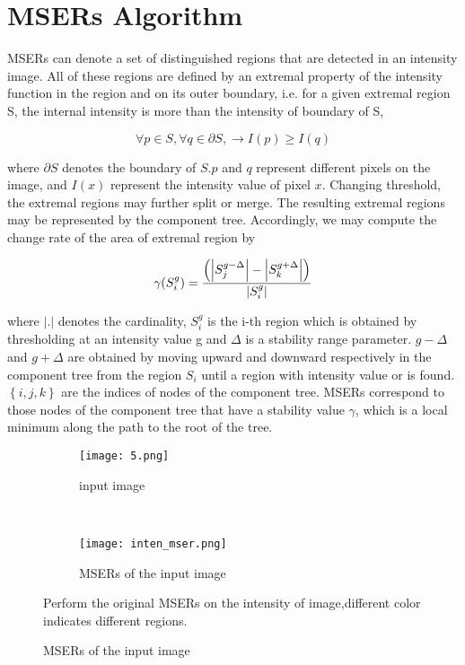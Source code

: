 \section{MSERs Algorithm}
MSERs can denote a set of distinguished regions that are detected in an intensity image. All of these regions are defined by an extremal property of the intensity function in the region and on its outer boundary, i.e. for a given extremal region S, the internal intensity is more than the intensity of boundary of S,

\[ \forall p \in S,\forall q \in \partial S , \longrightarrow I(p) \geq I(q)\]

where $\partial S $ denotes the boundary of $S$.$p$ and $q$ represent different pixels on the image, and $I(x)$ represent the intensity value of pixel $x$. 
Changing threshold, the extremal regions may further split or merge. The resulting extremal regions may be represented by the component tree. Accordingly, we may compute the change rate of the area of extremal region by

\[ \gamma(S_i^g) = \frac{\left ( \left |  S_j^{g-\Delta} \right |-\left |  S_k^{g+\Delta} \right | \right )}{\arrowvert S_i^g\arrowvert} \]

where $ \left | .  \right |$  denotes the cardinality, $ S_{i}^{g} $  is the i-th region which is obtained by thresholding at an intensity value g and $\Delta $ is a stability range parameter. $  g-\Delta $ and $ g+\Delta $ are obtained by moving upward and downward respectively in the component tree from the region $ S_{i} $ until a region with intensity value   or  is found. $ \left \{ i,j,k \right \}$ are the indices of nodes of the component tree. MSERs correspond to those nodes of the component tree that have a stability value $\gamma$, which is a local minimum along the path to the root of the tree.

\begin{figure}[H]
 	\centering
 	\begin{subfigure}[b]{0.4\textwidth}
		\centering
 		\texttt{[image: 5.png]}
 		\caption{input image}
 	\end{subfigure}
 		~  
 	\begin{subfigure}[b]{0.4\textwidth}
		\centering
	  	\texttt{[image: inten\_mser.png]}
 		\caption{MSERs of the input image}	
 	\end{subfigure}
 	\label{modifi_mser}
	Perform the original MSERs on the intensity of image,different color indicates different regions.
\end{figure}



